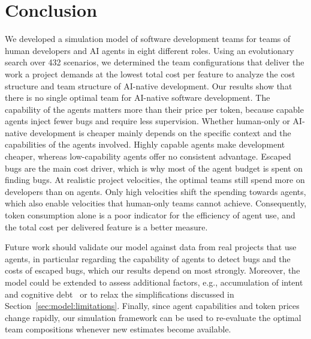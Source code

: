 \documentclass[smallextended]{svjour3}       %
\begin{document}
\section{Conclusion}
\label{sec:conclusion}

We developed a simulation model of software development teams for teams of human developers and AI agents in eight different roles. Using an evolutionary search over 432 scenarios, we determined the team configurations that deliver the work a project demands at the lowest total cost per feature to analyze the cost structure and team structure of AI-native development. Our results show that there is no single optimal team for AI-native software development. The capability of the agents matters more than their price per token, because capable agents inject fewer bugs and require less supervision. Whether human-only or AI-native development is cheaper mainly depends on the specific context and the capabilities of the agents involved. Highly capable agents make development cheaper, whereas low-capability agents offer no consistent advantage. Escaped bugs are the main cost driver, which is why most of the agent budget is spent on finding bugs. At realistic project velocities, the optimal teams still spend more on developers than on agents. Only high velocities shift the spending towards agents, which also enable velocities that human-only teams cannot achieve. Consequently, token consumption alone is a poor indicator for the efficiency of agent use, and the total cost per delivered feature is a better measure.

Future work should validate our model against data from real projects that use agents, in particular regarding the capability of agents to detect bugs and the costs of escaped bugs, which our results depend on most strongly. Moreover, the model could be extended to assess additional factors, e.g., accumulation of intent and cognitive debt~\citep{Storey2026} or to relax the simplifications discussed in Section~\ref{sec:model:limitations}. Finally, since agent capabilities and token prices change rapidly, our simulation framework can be used to re-evaluate the optimal team compositions whenever new estimates become available.










\end{document}
